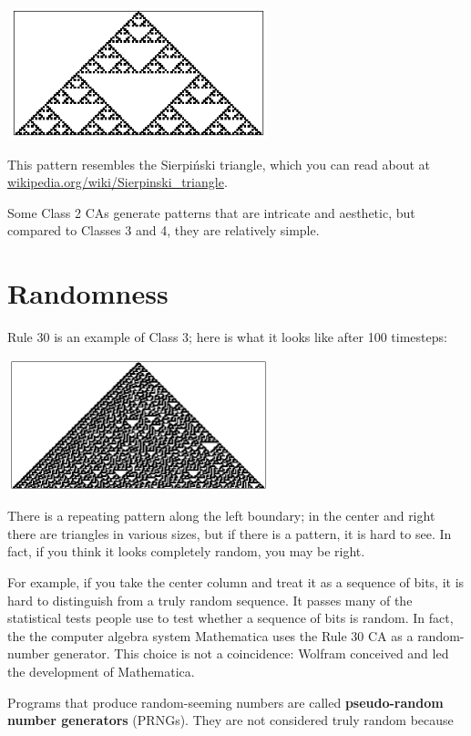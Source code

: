 \documentclass[10pt]{book}
\begin{document}
\beforefig
\centerline{\includegraphics[width=3.0in,height=1.5in]{figs/rule18.eps}}
\afterfig

This pattern resembles the Sierpi\'{n}ski triangle, which 
you can read about at \url{wikipedia.org/wiki/Sierpinski_triangle}.

Some Class 2 CAs generate patterns that are intricate and
aesthetic, but compared to Classes 3 and 4, they are relatively
simple.


\section{Randomness}

Rule 30 is an example of Class 3; here is what it looks like
after 100 timesteps:

\beforefig
\centerline{\includegraphics[width=3.0in,height=1.5in]{figs/rule30.eps}}
\afterfig

There is a repeating pattern along the left boundary; in the
center and right there are triangles in various sizes, but if
there is a pattern, it is hard to see.  In fact, if you think it
looks completely random, you may be right.

For example, if you take the center column and treat it as a
sequence of bits, it is hard to distinguish from a truly random
sequence.  It passes many of the statistical tests people use
to test whether a sequence of bits is random.  In fact, the
the computer algebra system Mathematica uses the Rule 30 CA as
a random-number generator.  This choice is not a coincidence:
Wolfram conceived and led the development of Mathematica.

Programs that produce random-seeming numbers are called
{\bf pseudo-random number generators} (PRNGs).  They are not considered
truly random because
\end{document}
